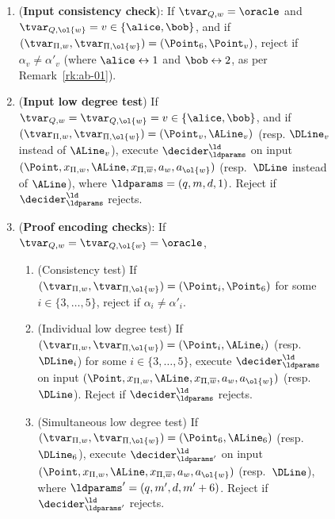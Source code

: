 \begin{figure}[!htb]
\begin{gamespec}
{\begin{enumerate}
    \item (\textbf{Input consistency check}): If $\tvar_{Q,w} = \oracle$ and
      $\tvar_{Q, \ol{w}} = v \in \{\alice,\bob\}$, and if $(\tvar_{\Pi,w},
      \tvar_{\Pi, \ol{w}}) = (\Point_6, \Point_{v})$, reject if $\alpha_{v} \neq
      \alpha'_{v}$ (where $\alice \leftrightarrow 1$ and $\bob \leftrightarrow
      2$, as per Remark~\ref{rk:ab-01}).
      \label{enu:ar-input-consistency}

    \item (\textbf{Input low degree test}) If $\tvar_{Q,w} = \tvar_{Q,\ol{w}} =
      v \in \{\alice,\bob\}$, and if $(\tvar_{\Pi,w}, \tvar_{\Pi, \ol{w}}) =
      (\Point_{v}, \ALine_{v})$ (resp.
      $\DLine_v$ instead of $\ALine_v$), execute $\decider^\ld_\ldparams$ on
      input $(\Point, x_{\Pi,w} ,\ALine, x_{\Pi,\overline{w}}, a_w, a_{\ol{w}})$
      (resp.\ $\DLine$ instead of $\ALine$), where $\ldparams = (q,m,d,1)$.
      Reject if $\decider^\ld_{\ldparams}$ rejects.
      \label{enu:ar-input-ld}

    \item (\textbf{Proof encoding checks}): If $\tvar_{Q,w} = \tvar_{Q,\ol{w}} =
      \oracle$,
      \begin{enumerate}
			\item (Consistency test) If $(\tvar_{\Pi,w}, \tvar_{\Pi, \ol{w}}) =
        (\Point_i, \Point_6)$ for some $i \in \{3, \dots, 5\}$, reject if
        $\alpha_i \neq \alpha'_i$.
        \label{enu:ar-proof-cons-ld}

      \item (Individual low degree test) If $(\tvar_{\Pi,w}, \tvar_{\Pi,
          \ol{w}}) = (\Point_i, \ALine_i)$ (resp.\ $\DLine_i$) for some $i \in
        \{3, \dots, 5\}$, execute $\decider^\ld_{\ldparams}$ on input $(\Point,
        x_{\Pi,w} ,\ALine,x_{\Pi,\overline{w}}, a_w,a_{\ol{w}})$ (resp.\ $\DLine$).
        Reject if $\decider^\ld_{\ldparams}$ rejects.
        \label{enu:ar-proof-id-ld}

      \item (Simultaneous low degree test) If $(\tvar_{\Pi, w}, \tvar_{\Pi,
          \ol{w}}) = (\Point_6, \ALine_6)$ (resp.\ $\DLine_6$), execute
        $\decider^\ld_{\ldparams'}$ on input $(\Point, x_{\Pi,w}, \ALine,
        x_{\Pi,\overline{w}}, a_w, a_{\ol{w}})$ (resp.\ $\DLine$), where
        $\ldparams'=(q, m', d, m'+6)$.
        Reject if $\decider^\ld_{\ldparams'}$ rejects.
        \label{enu:ar-proof-sim-ld}
      \end{enumerate}
      \label{enu:ar-proof-encoding}


\end{enumerate}}
\end{gamespec}
\end{figure}
